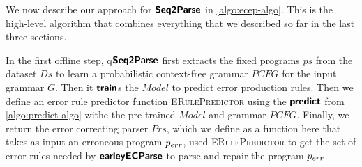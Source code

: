 

We now describe our approach for $\bm{\mathsf{Seq2Parse}}$ in \autoref{algo:ecep-algo}. This
is the high-level algorithm that combines everything that we described so far in
the last three sections.

In the first offline step, q$\bm{\mathsf{Seq2Parse}}$ first extracts the fixed programs $ps$
from the dataset $Ds$ to learn a probabilistic context-free grammar $PCFG$ for
the input grammar $G$. Then it $\bm{\mathsf{train}}$s the $Model$ to predict error
production rules. Then we define an error rule predictor function
\textsc{ERulePredictor} using the $\bm{\mathsf{predict}}$ from \autoref{algo:predict-algo}
withe the pre-trained $Model$ and grammar $PCFG$. Finally, we return the error
correcting parser $Prs$, which we define as a function here that takes as input
an erroneous program $p_{err}$, used \textsc{ERulePredictor} to get the set of
error rules needed by $\bm{\mathsf{earleyECParse}}$ to parse and repair the program $p_{err}$.
